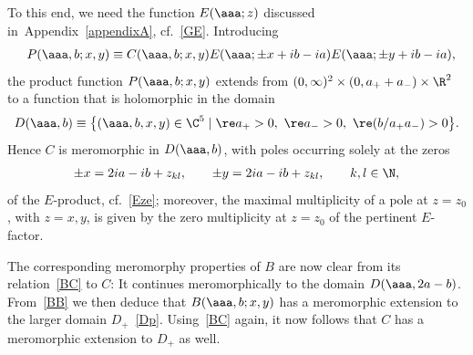 \documentclass[pdftex]{sigma}
\numberwithin{equation}{section}
\begin{document}
To this end, we need the function $E(\aaa;z)$ discussed in~Appendix~\ref{appendixA}, cf.~\eqref{GE}. Introducing
\begin{gather}\label{P}
P(\aaa,b;x,y)\equiv C(\aaa,b;x,y)E(\aaa;\pm x+ib-ia)E(\aaa;\pm y+ib-ia),\!\!\!\!
\end{gather}
the product function $P(\aaa,b;x,y)$ extends from $(0,\infty)^2\times (0,a_{+}+a_-)\times \R^2$ to a function that is holomorphic in the domain
\begin{gather}
D(\aaa,b)\equiv \big\{ (\aaa,b,x,y)\in \C^5 \mid \re a_+>0,\ \re a_->0, \ \re (b/a_+a_-)>0\big\}.
\end{gather}
 Hence $C$ is meromorphic in $D(\aaa,b)$, with poles occurring solely at the zeros
\begin{gather}
\pm x=2ia-ib+z_{kl},\qquad \pm y=2ia-ib+z_{kl},\qquad k,l\in\N,
\end{gather}
of the $E$-product, cf.~\eqref{Eze}; moreover, the maximal multiplicity of a pole at $z=z_0$, with $z=x,y$, is given by the zero multiplicity at $z=z_0$ of the pertinent $E$-factor.

The corresponding meromorphy properties of $B$ are now clear from its relation~\eqref{BC} to $C$: It continues meromorphically to the domain $D(\aaa,2a-b)$. From~\eqref{BB} we then deduce that $B(\aaa,b;x,y)$ has a meromorphic extension to the larger domain $D_+$~\eqref{Dp}.
Using~\eqref{BC} again, it now follows that $C$ has a meromorphic extension to $D_+$ as well.
\end{document}
